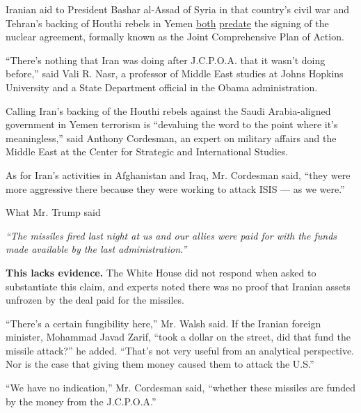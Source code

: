Iranian aid to President Bashar al-Assad of Syria in that country's
civil war and Tehran's backing of Houthi rebels in Yemen
\href{https://www.theguardian.com/world/2011/may/08/iran-helping-syrian-regime-protesters}{both}
\href{https://www.yahoo.com/news/iran-arming-yemens-huthi-rebels-since-2009-un-202936346.html?guccounter=1\&guce_referrer=aHR0cHM6Ly9lbi53aWtpcGVkaWEub3JnLw\&guce_referrer_sig=AQAAANfAtm7ElL-V-ArfyRoFMf8i9Pks3YI97lUAXHnGAVRYkSI9JPbe7SldOsNA6zSEASgtNaubY_nmARO39x4afp-T3lhYgJAxKRGj61dtVm5iNHjno5e6viM214GWRHmAVkkfIVLk2SmICJwIHaxhRDQR8p5SO0mPkgHFD-1pngp9}{predate}
the signing of the nuclear agreement, formally known as the Joint
Comprehensive Plan of Action.

``There's nothing that Iran was doing after J.C.P.O.A. that it wasn't
doing before,'' said Vali R. Nasr, a professor of Middle East studies at
Johns Hopkins University and a State Department official in the Obama
administration.

Calling Iran's backing of the Houthi rebels against the Saudi
Arabia-aligned government in Yemen terrorism is ``devaluing the word to
the point where it's meaningless,'' said Anthony Cordesman, an expert on
military affairs and the Middle East at the Center for Strategic and
International Studies.

As for Iran's activities in Afghanistan and Iraq, Mr. Cordesman said,
``they were more aggressive there because they were working to attack
ISIS --- as we were.''

What Mr. Trump said

\emph{``The missiles fired last night at us and our allies were paid for
with the funds made available by the last administration.''}

\textbf{This lacks evidence.} The White House did not respond when asked
to substantiate this claim, and experts noted there was no proof that
Iranian assets unfrozen by the deal paid for the missiles.

``There's a certain fungibility here,'' Mr. Walsh said. If the Iranian
foreign minister, Mohammad Javad Zarif, ``took a dollar on the street,
did that fund the missile attack?'' he added. ``That's not very useful
from an analytical perspective. Nor is the case that giving them money
caused them to attack the U.S.''

``We have no indication,'' Mr. Cordesman said, ``whether these missiles
are funded by the money from the J.C.P.O.A.''

